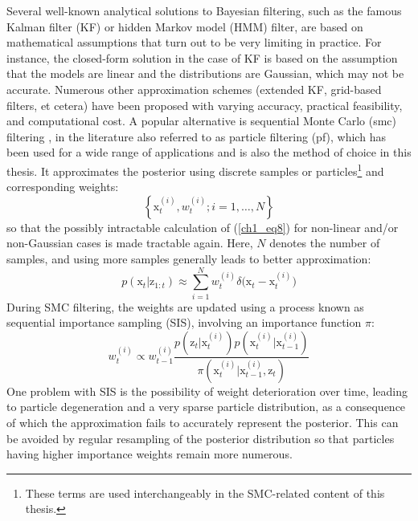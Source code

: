 Several well-known analytical solutions to Bayesian filtering, such as the famous Kalman filter (KF) or hidden Markov model (HMM) filter, are based on mathematical assumptions that turn out to be very limiting in practice. For instance, the closed-form solution in the case of KF is based on the assumption that the models are linear and the distributions are Gaussian, which may not be accurate. Numerous other approximation schemes (extended KF, grid-based filters, et cetera) have been proposed with varying accuracy, practical feasibility, and computational cost. A popular alternative is  sequential Monte Carlo (\gls{smc}) filtering \cite{arulampalam2002tutorial}, in the literature also referred to as particle filtering (\gls{pf}), which has been used for a wide range of applications and is also the method of choice in this thesis. It approximates the posterior using discrete samples or particles\footnote{These terms are used interchangeably in the SMC-related content of this thesis.} and corresponding weights:
\begin{equation}
\left\lbrace \mathrm{x}_{t}^{(i)}, w_{t}^{(i)}; i = 1, \dots , N \right\rbrace
\label{ch1_eq9}
\end{equation}
so that the possibly intractable calculation of (\ref{ch1_eq8}) for non-linear and/or non-Gaussian cases is made tractable again. Here, $N$ denotes the number of samples, and using more samples generally leads to better approximation:
\begin{equation}
p(\mathrm{x}_t | \mathrm{z}_{1:t}) \approx \sum_{i=1}^{N} w_{t}^{(i)}\delta\big(\mathrm{x}_{t} - \mathrm{x}_{t}^{(i)}\big)
\label{ch1_approx}
\end{equation}
During SMC filtering, the weights are updated using a process known as sequential importance sampling (SIS), involving an importance function $\pi$:
\begin{equation}
w_{t}^{(i)} \propto w_{t-1}^{(i)} \frac{p(\mathrm{z}_t | \mathrm{x}_{t}^{(i)}) p(\mathrm{x}_{t}^{(i)} | \mathrm{x}_{t-1}^{(i)} )}{ \pi(\mathrm{x}_{t}^{(i)} | \mathrm{x}_{t-1}^{(i)}, \mathrm{z}_{t}) }
\label{ch1_eq10}
\end{equation}
One problem with SIS is the possibility of weight deterioration over time, leading to particle degeneration and a very sparse particle distribution, as a consequence of which the approximation fails to accurately represent the posterior. This can be avoided by regular resampling of the posterior distribution so that particles having higher importance weights remain more numerous.

